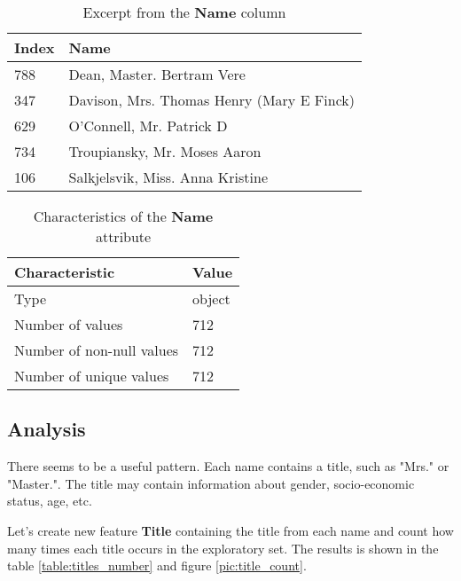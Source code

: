 \begin{table}[!hp]
    \centering
    \caption{Excerpt from the \textbf{Name} column}
    \begin{tabular}{|l|l|}
        \hline
        \textbf{Index} & \textbf{Name}                             \\ \hline
        788            & Dean, Master. Bertram Vere                \\ \hline
        347            & Davison, Mrs. Thomas Henry (Mary E Finck) \\ \hline
        629            & O'Connell, Mr. Patrick D                  \\ \hline
        734            & Troupiansky, Mr. Moses Aaron              \\ \hline
        106            & Salkjelsvik, Miss. Anna Kristine          \\ \hline
    \end{tabular}
    \label{table:name_column_excerpt}
\end{table}

\begin{table}[!hp]
    \centering
    \caption{Characteristics of the \textbf{Name} attribute}
    \begin{tabular}{|l|l|}
        \hline
        \textbf{Characteristic}   & \textbf{Value} \\ \hline
        Type                      & object         \\ \hline
        Number of values          & 712            \\ \hline
        Number of non-null values & 712            \\ \hline
        Number of unique values   & 712            \\ \hline
    \end{tabular}
    \label{table:name_characteristics}
\end{table}

\subsection{Analysis}
There seems to be a useful pattern. Each name contains a title, such as 
"Mrs." or "Master.". The title may contain information about gender, 
socio-economic status, age, etc. 

Let's create new feature \textbf{Title} containing the title from each 
name and count how many times each title occurs in the exploratory set. 
The results is shown in the table \ref{table:titles_number} and figure 
\ref{pic:title_count}.

